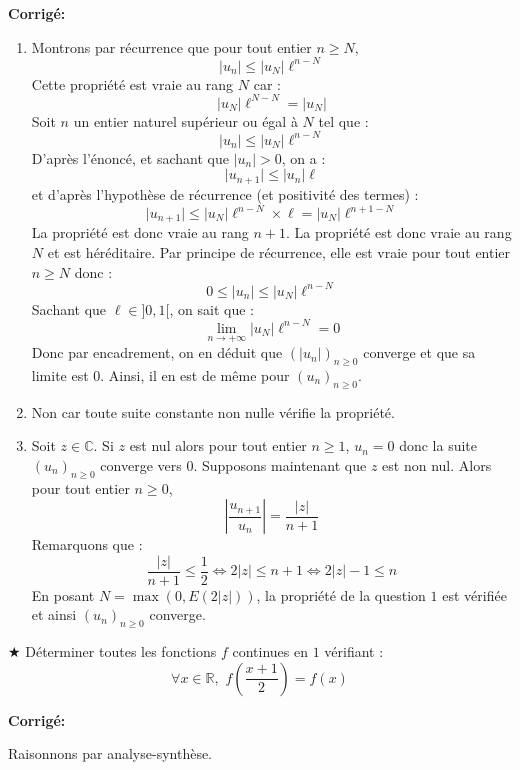 \documentclass[a4paper,twoside,french,10pt]{VcCours}
\newcommand{\corr}{\textbf{Corrigé:}}
\begin{document}
\corr



\begin{enumerate}
\item Montrons par récurrence que pour tout entier $n \geq N$,
$$ \vert u_n \vert  \leq \vert u_N \vert  \ell^{n-N}$$
Cette propriété est vraie au rang $N$ car :
$$ \vert u_N \vert \ell^{N-N} = \vert u_N \vert $$
Soit $n$ un entier naturel supérieur ou égal à $N$ tel que :
$$  \vert u_n \vert \leq \vert u_N \vert \ell^{n-N}$$
D'après l'énoncé, et sachant que $\vert u_n \vert >0$, on a :
$$ \vert u_{n+1} \vert \leq \vert u_n \vert \ell$$
et d'après l'hypothèse de récurrence (et positivité des termes) : 
$$  \vert u_{n+1} \vert \leq \vert u_N \vert \ell^{n-N} \times \ell = \vert u_N \vert \ell^{n+1-N}$$
La propriété est donc vraie au rang $n+1$. La propriété est donc vraie au rang $N$ et est héréditaire. Par principe de récurrence, elle est vraie pour tout entier $n \geq N$ donc :
$$ 0 \leq \vert u_n \vert \leq  \vert u_N \vert  \ell^{n-N}$$
Sachant que $\ell \in ]0,1[$, on sait que :
$$ \lim_{n \rightarrow + \infty} \vert u_N \vert  \ell^{n-N} = 0$$
Donc par encadrement, on en déduit que $(\vert u_n \vert)_{n \geq 0}$ converge et que sa limite est $0$. Ainsi, il en est de même pour $(u_n)_{n \geq 0}$.
\item Non car toute suite constante non nulle vérifie la propriété.
\item Soit $z \in \mathbb{C}$. Si $z$ est nul alors pour tout entier $n \geq 1$, $u_n=0$ donc la suite $(u_n)_{n \geq 0}$ converge vers $0$. Supposons maintenant que $z$ est non nul. Alors pour tout entier $n \geq 0$,
$$ \left\vert \dfrac{u_{n+1}}{u_n} \right\vert =\dfrac{\vert z \vert}{n+1}$$
Remarquons que :
$$ \dfrac{\vert z \vert}{n+1} \leq \dfrac{1}{2} \Longleftrightarrow  2 \vert z \vert \leq n+1 \Longleftrightarrow 2 \vert z \vert - 1 \leq n$$
En posant $N = \max(0, E(2 \vert z\vert))$, la propriété de la question $1$ est vérifiée et ainsi $(u_n)_{n \geq 0}$ converge.
\end{enumerate}

\medskip

\begin{Exercice}{$\bigstar$} Déterminer toutes les fonctions $f$ continues en $1$ vérifiant :
$$ \forall x \in \mathbb{R}, \, \, f \left( \frac{x+1}{2} \right) =f(x)$$
\end{Exercice}

\corr

Raisonnons par analyse-synthèse.
\end{document}
